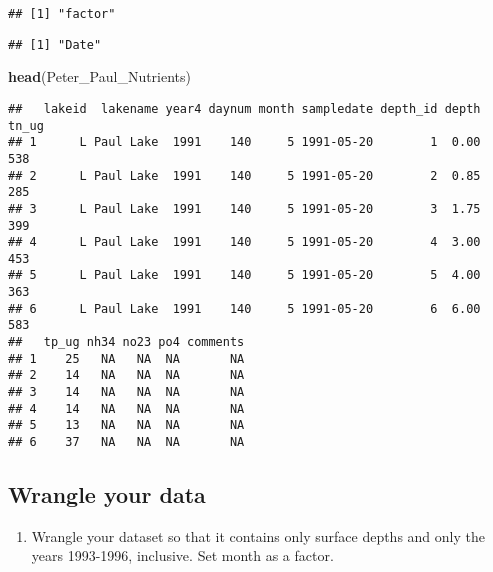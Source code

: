 \documentclass[]{article}
\newenvironment{Shaded}{\begin{snugshade}}{\end{snugshade}}
\newcommand{\CommentTok}[1]{\textcolor[rgb]{0.56,0.35,0.01}{\textit{#1}}}
\newcommand{\DataTypeTok}[1]{\textcolor[rgb]{0.13,0.29,0.53}{#1}}
\newcommand{\KeywordTok}[1]{\textcolor[rgb]{0.13,0.29,0.53}{\textbf{#1}}}
\newcommand{\NormalTok}[1]{#1}
\newcommand{\OperatorTok}[1]{\textcolor[rgb]{0.81,0.36,0.00}{\textbf{#1}}}
\newcommand{\StringTok}[1]{\textcolor[rgb]{0.31,0.60,0.02}{#1}}
\providecommand{\tightlist}{%
  \setlength{\itemsep}{0pt}\setlength{\parskip}{0pt}}
\begin{document}
\begin{verbatim}
## [1] "factor"
\end{verbatim}

\begin{Shaded}
\end{Shaded}

\begin{verbatim}
## [1] "Date"
\end{verbatim}

\begin{Shaded}
\begin{Highlighting}[]
\KeywordTok{head}\NormalTok{(Peter_Paul_Nutrients)}
\end{Highlighting}
\end{Shaded}

\begin{verbatim}
##   lakeid  lakename year4 daynum month sampledate depth_id depth tn_ug
## 1      L Paul Lake  1991    140     5 1991-05-20        1  0.00   538
## 2      L Paul Lake  1991    140     5 1991-05-20        2  0.85   285
## 3      L Paul Lake  1991    140     5 1991-05-20        3  1.75   399
## 4      L Paul Lake  1991    140     5 1991-05-20        4  3.00   453
## 5      L Paul Lake  1991    140     5 1991-05-20        5  4.00   363
## 6      L Paul Lake  1991    140     5 1991-05-20        6  6.00   583
##   tp_ug nh34 no23 po4 comments
## 1    25   NA   NA  NA       NA
## 2    14   NA   NA  NA       NA
## 3    14   NA   NA  NA       NA
## 4    14   NA   NA  NA       NA
## 5    13   NA   NA  NA       NA
## 6    37   NA   NA  NA       NA
\end{verbatim}

\hypertarget{wrangle-your-data}{%
\subsection{Wrangle your data}\label{wrangle-your-data}}

\begin{enumerate}
\def\labelenumi{\arabic{enumi}.}
\setcounter{enumi}{2}
\tightlist
\item
  Wrangle your dataset so that it contains only surface depths and only
  the years 1993-1996, inclusive. Set month as a factor.
\end{enumerate}
\end{document}
